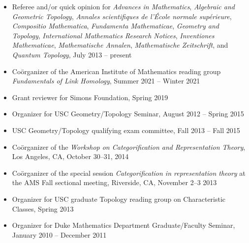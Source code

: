 \documentclass[10pt]{article}
\begin{document}
\begin{itemize}



\item Referee and/or quick opinion for 
{\it Advances in Mathematics}, 
{\it Algebraic and Geometric Topology}, 
{\it Annales scientifiques de l'\'{E}cole normale sup\'{e}rieure},
{\it Compositio Mathematica},
{\it Fundamenta Mathematicae}, 
{\it Geometry and Topology}, 
{\it International Mathematics Research Notices},
{\it Inventiones Mathematicae},
{\it Mathematische Annalen},
{\it Mathematische Zeitschrift},
and {\it Quantum Topology},
July 2013 -- present

\item Co\"{o}rganizer of the American Institute of Mathematics reading group \emph{Fundamentals of Link Homology},
Summer 2021 -- Winter 2021

\item Grant reviewer for Simons Foundation, Spring 2019

\item Organizer for USC Geometry/Topology Seminar, August 2012 -- Spring 2015

\item USC Geometry/Topology qualifying exam committee, Fall 2013 -- Fall 2015

\item Co\"{o}rganizer of the \emph{Workshop on Categorification and Representation Theory},
Los Angeles, CA, October 30--31, 2014

\item Co\"{o}rganizer of the special session \emph{Categorification in representation theory} at the AMS Fall sectional meeting,
Riverside, CA, November 2--3 2013

\item Organizer for USC graduate Topology reading group on Characteristic Classes, Spring 2013

\item Organizer for Duke Mathematics Department Graduate/Faculty Seminar, January 2010 -- December 2011

\end{itemize}






\end{document}
